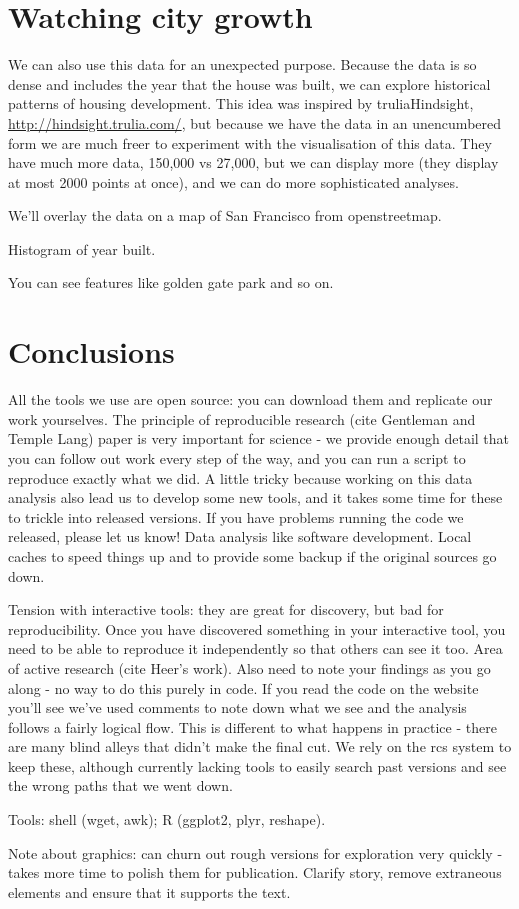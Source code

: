 \documentclass[oneside]{article}
\begin{document}
\section{Watching city growth}

We can also use this data for an unexpected purpose.  Because the data is so dense and includes the year that the house was built, we can explore historical patterns of housing development.  This idea was inspired by truliaHindsight, \url{http://hindsight.trulia.com/}, but because we have the data in an unencumbered form we are much freer to experiment with the visualisation of this data.  They have much more data, 150,000 vs 27,000, but we can display more (they display at most 2000 points at once), and we can do more sophisticated analyses.

We'll overlay the data on a map of San Francisco from openstreetmap.

Histogram of year built.

You can see features like golden gate park and so on.

\section{Conclusions}

All the tools we use are open source: you can download them and replicate our work yourselves.  The principle of reproducible research (cite Gentleman and Temple Lang) paper is very important for science - we provide enough detail that you can follow out work every step of the way, and you can run a script to reproduce exactly what we did.  A little tricky because working on this data analysis also lead us to develop some new tools, and it takes some time for these to trickle into released versions.  If you have problems running the code we released, please let us know!  Data analysis like software development.  Local caches to speed things up and to provide some backup if the original sources go down.

Tension with interactive tools: they are great for discovery, but bad for reproducibility.  Once you have discovered something in your interactive tool, you need to be able to reproduce it independently so that others can see it too.  Area of active research (cite Heer's work).  Also need to note your findings as you go along - no way to do this purely in code.  If you read the code on the website you'll see we've used comments to note down what we see and the analysis follows a fairly logical flow.  This is different to what happens in practice - there are many blind alleys that didn't make the final cut.  We rely on the rcs system to keep these, although currently lacking tools to easily search past versions and see the wrong paths that we went down.

Tools: shell (wget, awk); R (ggplot2, plyr, reshape).

Note about graphics: can churn out rough versions for exploration very quickly - takes more time to polish them for publication.  Clarify story, remove extraneous elements and ensure that it supports the text.



\end{document}
